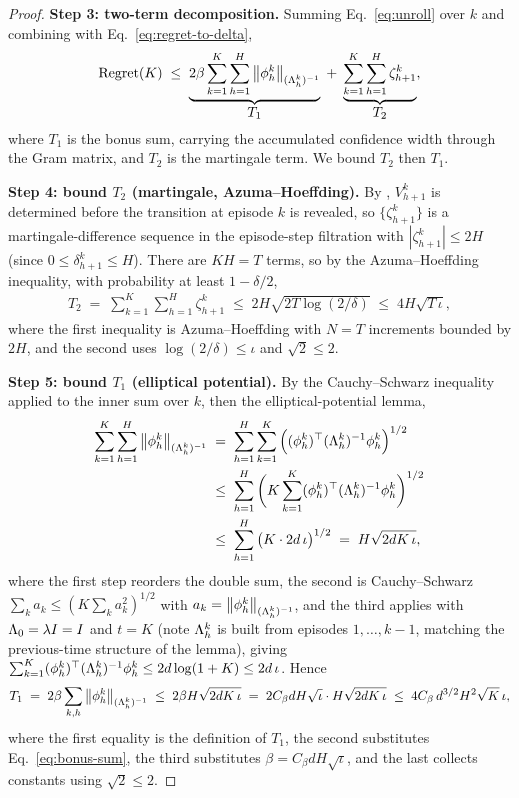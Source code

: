 \begin{proof}
\smallskip\noindent\textbf{Step 3: two-term decomposition.}
Summing Eq.~\eqref{eq:unroll} over $k$ and combining with
Eq.~\eqref{eq:regret-to-delta},
\begin{align}\label{eq:three-term}
\mathrm{Regret}(K)
\;\le\;
\underbrace{2\beta\sum_{k=1}^K\sum_{h=1}^H \left\| \phi_h^k \right\|_{(\Lambda_h^k)^{-1}}}_{\textstyle T_1}
\;+\;
\underbrace{\sum_{k=1}^K\sum_{h=1}^H \zeta_{h+1}^k}_{\textstyle T_2},
\end{align}
where $T_1$ is the bonus sum, carrying the accumulated confidence width through
the Gram matrix, and $T_2$ is the martingale term. We bound $T_2$ then $T_1$.

\smallskip\noindent\textbf{Step 4: bound $T_2$ (martingale, Azuma--Hoeffding).}
By , $V_{h+1}^k$ is determined before the transition at
episode $k$ is revealed, so $\{\zeta_{h+1}^k\}$ is a martingale-difference
sequence in the episode-step filtration with $|\zeta_{h+1}^k|\le 2H$ (since
$0\le\delta_{h+1}^k\le H$). There are $KH=T$ terms, so by the Azuma--Hoeffding
inequality, with probability at least $1-\delta/2$,
\begin{align}\label{eq:T3-bound}
T_2 \;=\; \sum_{k=1}^K\sum_{h=1}^H \zeta_{h+1}^k
\;\le\; 2H\sqrt{2T\log(2/\delta)}
\;\le\; 4H\sqrt{T\,\iota},
\end{align}
where the first inequality is Azuma--Hoeffding with $N=T$ increments bounded by
$2H$, and the second uses $\log(2/\delta)\le\iota$ and $\sqrt2\le2$.

\smallskip\noindent\textbf{Step 5: bound $T_1$ (elliptical potential).}
By the Cauchy--Schwarz inequality applied to the inner sum over $k$, then the
elliptical-potential lemma,
\begin{align}
\sum_{k=1}^K\sum_{h=1}^H \left\| \phi_h^k \right\|_{(\Lambda_h^k)^{-1}}
&\;=\; \sum_{h=1}^H \sum_{k=1}^K \Big( (\phi_h^k)^\top (\Lambda_h^k)^{-1}\phi_h^k \Big)^{1/2} \notag \\
&\;\le\; \sum_{h=1}^H \bigg( K \sum_{k=1}^K (\phi_h^k)^\top (\Lambda_h^k)^{-1}\phi_h^k \bigg)^{1/2} \notag \\
&\;\le\; \sum_{h=1}^H \big( K\cdot 2d\,\iota \big)^{1/2}
\;=\; H\sqrt{2dK\,\iota}, \label{eq:bonus-sum}
\end{align}
where the first step reorders the double sum, the second is Cauchy--Schwarz
$\sum_k a_k\le(K\sum_k a_k^2)^{1/2}$ with $a_k=\left\| \phi_h^k \right\|_{(\Lambda_h^k)^{-1}}$, and the third applies  with
$\Lambda_0=\lambda I=I$ and $t=K$ (note $\Lambda_h^k$ is built from episodes
$1,\dots,k-1$, matching the previous-time structure of the lemma), giving
$\sum_{k=1}^K(\phi_h^k)^\top(\Lambda_h^k)^{-1}\phi_h^k\le 2d\log(1+K)\le
2d\,\iota$. Hence
\begin{align}\label{eq:T12-bound}
T_1 \;=\; 2\beta\sum_{k,h}\left\| \phi_h^k \right\|_{(\Lambda_h^k)^{-1}}
\;\le\; 2\beta H\sqrt{2dK\,\iota}
\;=\; 2 C_\beta dH\sqrt{\iota}\cdot H\sqrt{2dK\,\iota}
\;\le\; 4 C_\beta\, d^{3/2} H^2 \sqrt{K}\,\iota,
\end{align}
where the first equality is the definition of $T_1$, the second substitutes
Eq.~\eqref{eq:bonus-sum}, the third substitutes $\beta=C_\beta dH\sqrt{\iota}$,
and the last collects constants using $\sqrt2\le2$.


\end{proof}
